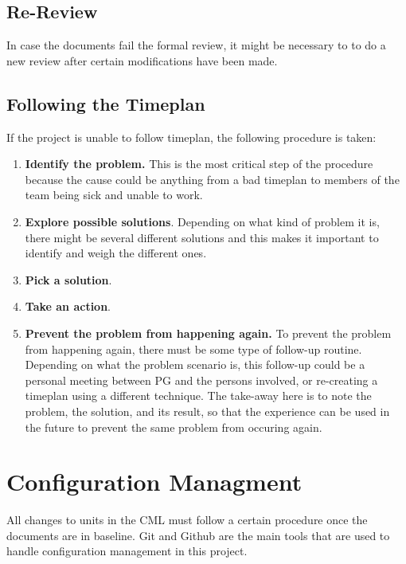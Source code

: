\documentclass{article}
\begin{document}
    \subsection{Re-Review}
        In case the documents fail the formal review, it might be necessary to
        to do a new review after certain modifications have been made.
            
    \subsection{Following the Timeplan}
        If the project is unable to follow timeplan, the following procedure is taken:
        \begin{enumerate}
            \item \textbf{Identify the problem.} This is the most critical step of the            procedure because the cause could be anything from a bad timeplan to
                    members of the team being sick and unable to work.
            \item \textbf{Explore possible solutions}. Depending on what kind of problem it is, there might be several different solutions and this makes it important to identify and weigh the different ones.
            \item \textbf{Pick a solution}. 
            \item \textbf{Take an action}. 
            \item \textbf{Prevent the problem from happening again.}
                    To prevent the problem from happening again, there must be some
                    type of follow-up routine. Depending on what the problem scenario is,
                    this follow-up could be a personal meeting between PG and the persons
                    involved, or re-creating a timeplan using a different technique.
                    The take-away here is to note the problem, the solution, and its
                    result, so that the experience can be used in the future to prevent
                    the same problem from occuring again.
        \end{enumerate}

\section{Configuration Managment}   %
    All changes to units in the CML must follow a certain procedure once the documents
    are in baseline. Git and Github are the main tools that are used to handle configuration management in this project.
\end{document}
